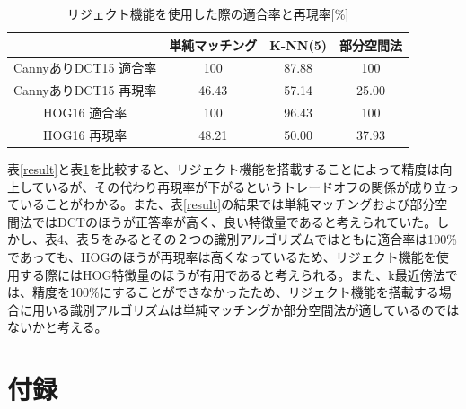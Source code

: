 \documentclass[10.5pt,a4j]{jarticle}
\begin{document}
	\begin{table}[H]
		\begin{center}
			\caption{リジェクト機能を使用した際の適合率と再現率[\%]}
			\label{recall_precision}
			\begin{tabular}{|c|c|c|c|}\hline
									& 単純マッチング	& K-NN(5)	& 部分空間法 \\ \hline \hline
				CannyありDCT15 適合率	& 100			& 87.88		& 100		\\ \hline
				CannyありDCT15 再現率	& 46.43			& 57.14		& 25.00		\\ \hline
				HOG16 適合率			& 100			& 96.43		& 100		\\ \hline
				HOG16 再現率			& 48.21			& 50.00		& 37.93		\\ \hline
		    \end{tabular}
		\end{center}
	\end{table}
	表\ref{result}と表\ref{recall_precision}を比較すると、リジェクト機能を搭載することによって精度は向上しているが、その代わり再現率が下がるというトレードオフの関係が成り立っていることがわかる。また、表\ref{result}の結果では単純マッチングおよび部分空間法ではDCTのほうが正答率が高く、良い特徴量であると考えられていた。しかし、表4、表５をみるとその２つの識別アルゴリズムではともに適合率は100\%であっても、HOGのほうが再現率は高くなっているため、リジェクト機能を使用する際にはHOG特徴量のほうが有用であると考えられる。また、k最近傍法では、精度を100\%にすることができなかったため、リジェクト機能を搭載する場合に用いる識別アルゴリズムは単純マッチングか部分空間法が適しているのではないかと考える。

	\newpage
	\section{付録}
\end{document}
